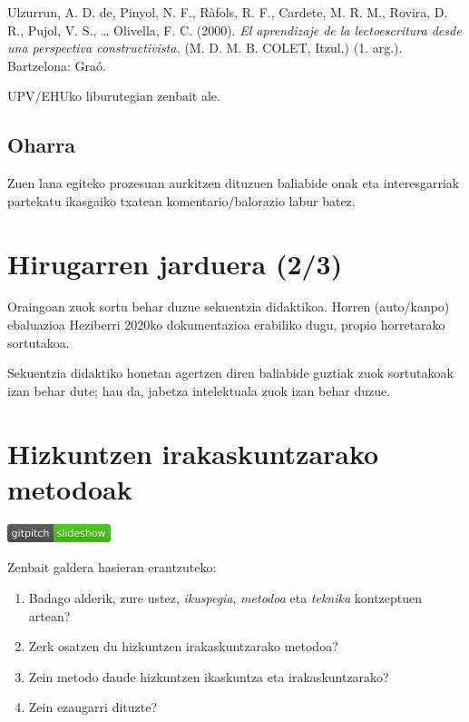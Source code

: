 \documentclass[]{book}
\providecommand{\tightlist}{%
  \setlength{\itemsep}{0pt}\setlength{\parskip}{0pt}}
\begin{document}
Ulzurrun, A. D. de, Pinyol, N. F., Ràfols, R. F., Cardete, M. R. M., Rovira, D. R., Pujol, V. S., \ldots{} Olivella, F. C. (2000). \emph{El aprendizaje de la lectoescritura desde una perspectiva constructivista.} (M. D. M. B. COLET, Itzul.) (1. arg.). Bartzelona: Graó.

UPV/EHUko liburutegian zenbait ale.

\hypertarget{oharra}{%
\section{Oharra}\label{oharra}}

Zuen lana egiteko prozesuan aurkitzen dituzuen baliabide onak eta interesgarriak partekatu ikasgaiko txatean komentario/balorazio labur batez.

\hypertarget{hirugarren-jarduera-23}{%
\chapter*{Hirugarren jarduera (2/3)}\label{hirugarren-jarduera-23}}

Oraingoan zuok sortu behar duzue sekuentzia didaktikoa. Horren (auto/kanpo) ebaluazioa Heziberri 2020ko dokumentazioa erabiliko dugu, propio horretarako sortutakoa.

Sekuentzia didaktiko honetan agertzen diren baliabide guztiak zuok sortutakoak izan behar dute; hau da, jabetza intelektuala zuok izan behar duzue.

\hypertarget{hizkuntzen-irakaskuntzarako-metodoak}{%
\chapter{Hizkuntzen irakaskuntzarako metodoak}\label{hizkuntzen-irakaskuntzarako-metodoak}}

\href{../Diapoak/05_Metodoak.html}{\includegraphics{assets/badge.png}}

Zenbait galdera hasieran erantzuteko:

\begin{enumerate}
\def\labelenumi{\arabic{enumi}.}
\tightlist
\item
  Badago alderik, zure ustez, \emph{ikuspegia}, \emph{metodoa} eta \emph{teknika} kontzeptuen artean?
\item
  Zerk osatzen du hizkuntzen irakaskuntzarako metodoa?
\item
  Zein metodo daude hizkuntzen ikaskuntza eta irakaskuntzarako?
\item
  Zein ezaugarri dituzte?
\end{enumerate}
\end{document}
